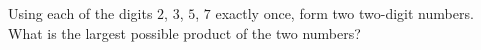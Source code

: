 Using each of the digits $2$, $3$, $5$, $7$ exactly once, form two two-digit numbers. What is the largest possible product of the two numbers?
